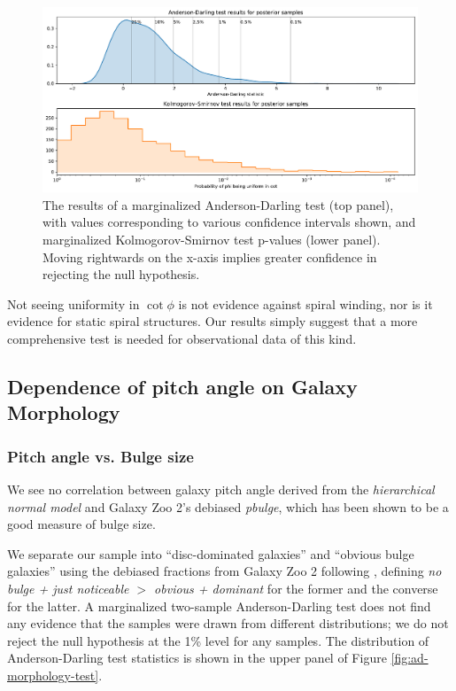 \begin{figure}
  \includegraphics[width=17.7cm]{plots/cot_uniform_marginalized_tests.pdf}
  \caption{The results of a marginalized Anderson-Darling test (top panel), with values corresponding to various confidence intervals shown, and marginalized Kolmogorov-Smirnov test p-values (lower panel). Moving rightwards on the x-axis implies greater confidence in rejecting the null hypothesis.}
  \label{fig:ad-cot-test}
\end{figure}

Not seeing uniformity in $\cot\phi$ is not evidence against spiral winding, nor is it evidence for static spiral structures. Our results simply suggest that a more comprehensive test is needed for observational data of this kind.


\subsection{Dependence of pitch angle on Galaxy Morphology}
\label{section:morphology_comparision}
\subsubsection{Pitch angle vs. Bulge size}
We see no correlation between galaxy pitch angle derived from the \textit{hierarchical normal model} and Galaxy Zoo 2's debiased \citep{Willett2013:1308.3496v2} \textit{pbulge}, which has been shown to be a good measure of bulge size.

We separate our sample into ``disc-dominated galaxies'' and ``obvious bulge galaxies'' using the debiased fractions from Galaxy Zoo 2 following \citet{2017MNRAS.469.3363K}, defining \textit{no bulge + just noticeable $>$ obvious + dominant} for the former and the converse for the latter. A marginalized two-sample Anderson-Darling test \citep{doi:10.1080/01621459.1987.10478517} does not find any evidence that the samples were drawn from different distributions; we do not reject the null hypothesis at the 1\% level for any samples. The distribution of Anderson-Darling test statistics is shown in the upper panel of Figure \ref{fig:ad-morphology-test}.


